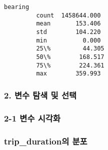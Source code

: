 \documentclass[11pt]{article}
\begin{document}
\begin{Verbatim}[commandchars=\\\{\}]
                    bearing  
         count  1458644.000  
         mean       153.406  
         std        104.220  
         min          0.000  
         25\%         44.305  
         50\%        168.517  
         75\%        224.361  
         max        359.993  
\end{Verbatim}
            
    \hypertarget{uxbcc0uxc218-uxd0d0uxc0c9-uxbc0f-uxc120uxd0dd}{%
\subsubsection{2. 변수 탐색 및
선택}\label{uxbcc0uxc218-uxd0d0uxc0c9-uxbc0f-uxc120uxd0dd}}

\hypertarget{uxbcc0uxc218-uxc2dcuxac01uxd654}{%
\subsubsection{2-1 변수 시각화}\label{uxbcc0uxc218-uxc2dcuxac01uxd654}}

    \hypertarget{trip_durationuxc758-uxbd84uxd3ec}{%
\subsubsection{trip\_duration의
분포}\label{trip_durationuxc758-uxbd84uxd3ec}}
\end{document}
